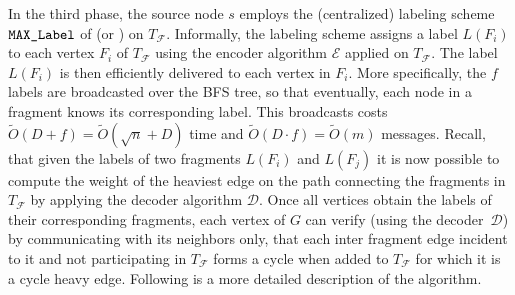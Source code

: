 \documentclass[11pt,letter]{article}
\def\LAB{\mbox{\tt MAX\_Label}}
\def\cD{\mathcal{D}}
\def\cE{\mathcal{E}}
\def\cD{\mathcal{D}}
\def\cF{\mathcal{F}}
\begin{document}
In the third phase, the source node $s$ employs the (centralized) labeling scheme $\LAB$ of \cite{KKKP_05} (or \cite{KK07}) on $T_{\cF}$. 
Informally, the labeling scheme assigns a label $L(F_i)$ to each vertex $F_i$ of $T_{\cF}$ 
using  the encoder algorithm $\cE$ applied on $T_{\cF}$. The label $L(F_i)$ is then efficiently delivered to each vertex in $F_i$.
More specifically, the $f$ labels are broadcasted over the BFS tree, so that eventually, each node in a fragment knows its corresponding label. This broadcasts costs $\tilde{O}(D+f)=\tilde{O}(\sqrt{n}+D)$ time and $\tilde{O}(D\cdot f)=\tilde{O}(m)$ messages.
Recall, that given the labels of two fragments $L(F_i)$ and $L(F_j)$ it is now possible to 
compute the weight of the heaviest edge on the path connecting the fragments 
in $T_{\cF}$ by applying the decoder algorithm $\cD$. Once all vertices obtain the labels of their corresponding fragments, each vertex of $G$ can verify  (using the decoder~$\cD$) by communicating with its neighbors only,
that each inter fragment edge incident to it and not participating in 
$T_{\cF}$ forms a cycle when added to $T_{\cF}$ for which it is a cycle heavy 
edge. Following is a more detailed description of the algorithm.
\end{document}
